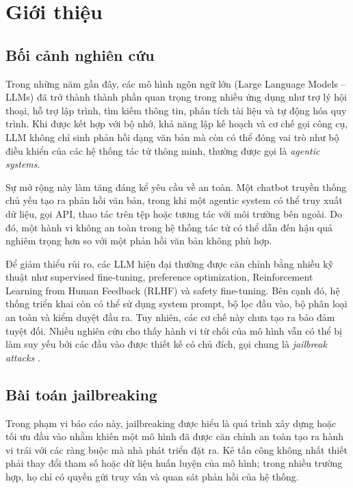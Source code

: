 \section{Giới thiệu}
\label{sec:introduction}

\subsection{Bối cảnh nghiên cứu}
\label{subsec:introduction-context}

Trong những năm gần đây, các mô hình ngôn ngữ lớn
(Large Language Models -- LLMs) đã trở thành thành phần quan trọng trong
nhiều ứng dụng như trợ lý hội thoại, hỗ trợ lập trình, tìm kiếm thông tin,
phân tích tài liệu và tự động hóa quy trình. Khi được kết hợp với bộ nhớ,
khả năng lập kế hoạch và cơ chế gọi công cụ, LLM không chỉ sinh phản hồi
dạng văn bản mà còn có thể đóng vai trò như bộ điều khiển của các hệ thống
tác tử thông minh, thường được gọi là \textit{agentic systems}.

Sự mở rộng này làm tăng đáng kể yêu cầu về an toàn. Một chatbot truyền
thống chủ yếu tạo ra phản hồi văn bản, trong khi một agentic system có thể
truy xuất dữ liệu, gọi API, thao tác trên tệp hoặc tương tác với môi trường
bên ngoài. Do đó, một hành vi không an toàn trong hệ thống tác tử có thể
dẫn đến hậu quả nghiêm trọng hơn so với một phản hồi văn bản không phù hợp.

Để giảm thiểu rủi ro, các LLM hiện đại thường được căn chỉnh bằng nhiều
kỹ thuật như supervised fine-tuning, preference optimization, Reinforcement
Learning from Human Feedback (RLHF) và safety fine-tuning. Bên cạnh đó,
hệ thống triển khai còn có thể sử dụng system prompt, bộ lọc đầu vào, bộ
phân loại an toàn và kiểm duyệt đầu ra. Tuy nhiên, các cơ chế này chưa tạo
ra bảo đảm tuyệt đối. Nhiều nghiên cứu cho thấy hành vi từ chối của mô hình
vẫn có thể bị làm suy yếu bởi các đầu vào được thiết kế có chủ đích, gọi
chung là \textit{jailbreak attacks}
\cite{yi2024jailbreak,zou2023universal,chao2023pair}.

\subsection{Bài toán jailbreaking}
\label{subsec:jailbreaking-problem}

Trong phạm vi báo cáo này, jailbreaking được hiểu là quá trình xây dựng
hoặc tối ưu đầu vào nhằm khiến một mô hình đã được căn chỉnh an toàn tạo
ra hành vi trái với các ràng buộc mà nhà phát triển đặt ra. Kẻ tấn công
không nhất thiết phải thay đổi tham số hoặc dữ liệu huấn luyện của mô hình;
trong nhiều trường hợp, họ chỉ có quyền gửi truy vấn và quan sát phản hồi
của hệ thống.

